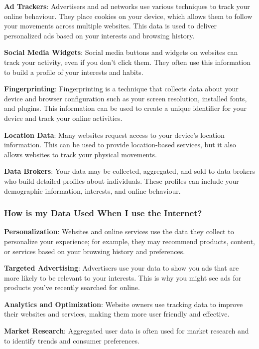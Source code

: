 \documentclass[
  letterpaper,
  DIV=11,
  numbers=noendperiod]{scrreprt}
\begin{document}
\textbf{Ad Trackers}: Advertisers and ad networks use various techniques
to track your online behaviour. They place cookies on your device, which
allows them to follow your movements across multiple websites. This data
is used to deliver personalized ads based on your interests and browsing
history.

\textbf{Social Media Widgets}: Social media buttons and widgets on
websites can track your activity, even if you don't click them. They
often use this information to build a profile of your interests and
habits.

\textbf{Fingerprinting}: Fingerprinting is a technique that collects
data about your device and browser configuration such as your screen
resolution, installed fonts, and plugins. This information can be used
to create a unique identifier for your device and track your online
activities.

\textbf{Location Data}: Many websites request access to your device's
location information. This can be used to provide location-based
services, but it also allows websites to track your physical movements.

\textbf{Data Brokers}: Your data may be collected, aggregated, and sold
to data brokers who build detailed profiles about individuals. These
profiles can include your demographic information, interests, and online
behaviour.

\subsubsection*{How is my Data Used When I use the
Internet?}\label{how-is-my-data-used-when-i-use-the-internet}

\textbf{Personalization}: Websites and online services use the data they
collect to personalize your experience; for example, they may recommend
products, content, or services based on your browsing history and
preferences.

\textbf{Targeted Advertising}: Advertisers use your data to show you ads
that are more likely to be relevant to your interests. This is why you
might see ads for products you've recently searched for online.

\textbf{Analytics and Optimization}: Website owners use tracking data to
improve their websites and services, making them more user friendly and
effective.

\textbf{Market Research}: Aggregated user data is often used for market
research and to identify trends and consumer preferences.
\end{document}
